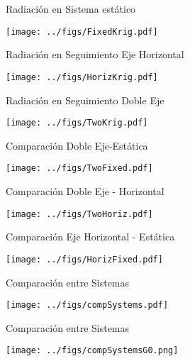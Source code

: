 \documentclass[aspectratio=169, usenames,svgnames,dvipsnames]{beamer}
\begin{document}
\begin{frame}[label={sec:org0d9766d}]{Radiación en Sistema estático}
\begin{center}
\texttt{[image: ../figs/FixedKrig.pdf]}
\end{center}
\end{frame}



\begin{frame}[label={sec:orgf03d7d8}]{Radiación en Seguimiento Eje Horizontal}
\begin{center}
\texttt{[image: ../figs/HorizKrig.pdf]}
\end{center}
\end{frame}



\begin{frame}[label={sec:org0c430c8}]{Radiación en Seguimiento Doble Eje}
\begin{center}
\texttt{[image: ../figs/TwoKrig.pdf]}
\end{center}
\end{frame}


\begin{frame}[label={sec:org93cdd50}]{Comparación Doble Eje-Estática}
\begin{center}
\texttt{[image: ../figs/TwoFixed.pdf]}
\end{center}
\end{frame}



\begin{frame}[label={sec:orgcd30d8b}]{Comparación Doble Eje - Horizontal}
\begin{center}
\texttt{[image: ../figs/TwoHoriz.pdf]}
\end{center}
\end{frame}



\begin{frame}[label={sec:orgf109851}]{Comparación Eje Horizontal - Estática}
\begin{center}
\texttt{[image: ../figs/HorizFixed.pdf]}
\end{center}
\end{frame}



\begin{frame}[label={sec:orgfeb0daa}]{Comparación entre Sistemas}
\begin{center}
\texttt{[image: ../figs/compSystems.pdf]}
\end{center}
\end{frame}

\begin{frame}[label={sec:org6bd6e20}]{Comparación entre Sistemas}
\begin{center}
\texttt{[image: ../figs/compSystemsG0.png]}
\end{center}
\end{frame}
\end{document}
